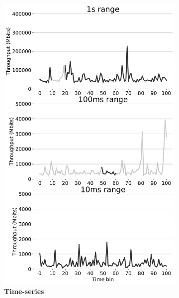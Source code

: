 \begin{figure}[t]
    \centering
    \begin{subfigure}[t]{0.38\linewidth}
\includegraphics[width=1\linewidth]{figs/self_similarity.pdf}
    \caption{\textbf{Time-series}}
	\label{fig:self-sim}
\end{subfigure}
    \begin{subfigure}[t]{0.33\linewidth}

\end{subfigure}
\end{figure}
